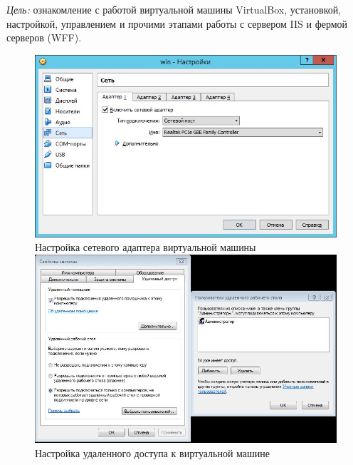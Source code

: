 \documentclass[pscyr,10pt]{hedlab}
\date{23 декабря 2014 г.}
\begin{document}
  \makeheader
  
  \emph{Цель:} ознакомление с работой виртуальной машины VirtualBox,
  установкой, настройкой, управлением и прочими этапами работы с сервером IIS и
  фермой серверов (WFF).
  
  \begin{figure}[h!]
    \center
    \includegraphics[width=.8\textwidth]{net_setup}\\
    Настройка сетевого адаптера виртуальной машины\\[2em]
    
    \includegraphics[width=.8\textwidth]{remote_access}\\
    Настройка удаленного доступа к виртуальной машине
  \end{figure}
  
  \newpage
  
\end{document}
